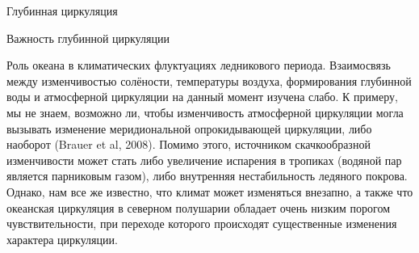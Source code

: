 \begin{chapter}{Глубинная циркуляция}
\begin{section}{Важность глубинной циркуляции}
\begin{paragraph}{Роль океана в климатических флуктуациях ледникового периода.}
Взаимосвязь между изменчивостью солёности, температуры воздуха, формирования
глубинной воды и атмосферной циркуляции на данный момент изучена слабо.
К примеру, мы не знаем, возможно ли, чтобы изменчивость атмосферной циркуляции
могла вызывать изменение меридиональной опрокидывающей циркуляции, 
либо наоборот (Brauer et al, 2008). Помимо этого, источником скачкообразной
изменчивости может стать либо увеличение испарения в тропиках 
(водяной пар является парниковым газом),
либо внутренняя нестабильность ледяного покрова. Однако, нам все же известно,
что климат может изменяться внезапно, а также что океанская циркуляция 
в северном полушарии обладает очень низким порогом чувствительности, при
переходе которого происходят существенные изменения характера циркуляции. 
%


\end{paragraph}
\end{section}
\end{chapter}

